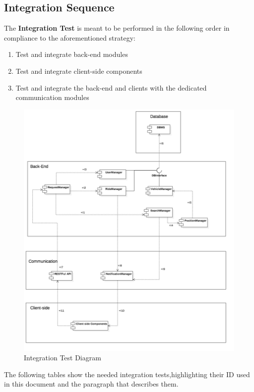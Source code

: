 \subsection{Integration Sequence}
\label{sub:IntSeq}
The \textbf{Integration Test} is meant to be performed in the following order in compliance to the aforementioned  strategy:

\begin{enumerate}
\item Test and integrate back-end modules
\item Test and integrate client-side components
\item Test and integrate the back-end and clients with the dedicated communication
modules
\end{enumerate}
\clearpage


\FloatBarrier
\begin{figure}
\centering
\caption{Integration Test Diagram}
\includegraphics[scale=0.45]{Images/Diagram2.png}
\end{figure}
\FloatBarrier
\newpage

The following tables show the needed integration tests,highlighting their ID used in this document and the paragraph that describes them.\\
\FloatBarrier
